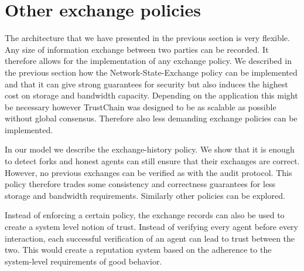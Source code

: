 \section{Other exchange policies}
\label{sec:system_trust}
The architecture that we have presented in the previous section is very flexible. Any size of information 
exchange between two parties can be recorded. It therefore allows for the implementation of any 
exchange policy. We described in the previous section how the Network-State-Exchange policy can be implemented
and that it can give strong guarantees for security but also induces the highest cost on storage and bandwidth 
capacity. Depending on the application this might be necessary however TrustChain was designed to 
be as scalable as possible without global consensus. Therefore also less demanding exchange policies
can be implemented.

In our model we describe the exchange-history policy. We show that it is enough to detect forks 
and honest agents can still ensure that their exchanges are correct. However, no previous exchanges 
can be verified as with the audit protocol. This policy therefore trades some consistency and 
correctness guarantees for less storage and bandwidth requirements. Similarly other policies can 
be explored.

Instead of enforcing a certain policy, the exchange records can also be used to create a system level 
notion of trust. Instead of verifying every agent before every interaction, each successful verification
of an agent can lead to trust between the two. This would create a reputation system based on the
adherence to the system-level requirements of good behavior. 





